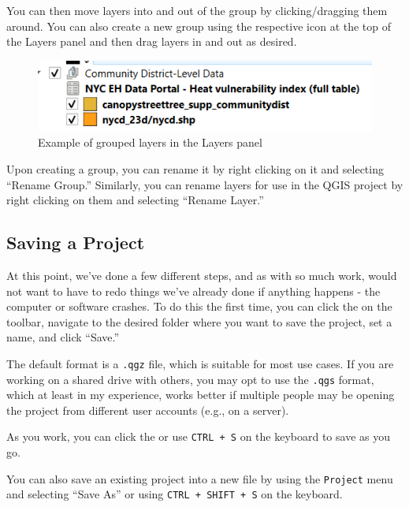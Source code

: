 \documentclass[
  letterpaper,
  DIV=11,
  numbers=noendperiod]{scrreprt}
\begin{document}
You can then move layers into and out of the group by clicking/dragging
them around. You can also create a new group using the respective icon
at the top of the Layers panel
 and then drag
layers in and out as desired.

\begin{figure}

{\centering \includegraphics{./images/grouped_layers.png}

}

\caption{Example of grouped layers in the Layers panel}

\end{figure}

Upon creating a group, you can rename it by right clicking on it and
selecting ``Rename Group.'' Similarly, you can rename layers for use in
the QGIS project by right clicking on them and selecting ``Rename
Layer.''

\hypertarget{saving-a-project}{%
\subsection{Saving a Project}\label{saving-a-project}}

At this point, we've done a few different steps, and as with so much
work, would not want to have to redo things we've already done if
anything happens - the computer or software crashes. To do this the
first time, you can click the
 on the toolbar,
navigate to the desired folder where you want to save the project, set a
name, and click ``Save.''

The default format is a \texttt{.qgz} file, which is suitable for most
use cases. If you are working on a shared drive with others, you may opt
to use the \texttt{.qgs} format, which at least in my experience, works
better if multiple people may be opening the project from different user
accounts (e.g., on a server).

As you work, you can click the
 or use
\texttt{CTRL\ +\ S} on the keyboard to save as you go.

You can also save an existing project into a new file by using the
\texttt{Project} menu and selecting ``Save As'' or using
\texttt{CTRL\ +\ SHIFT\ +\ S} on the keyboard.
\end{document}
